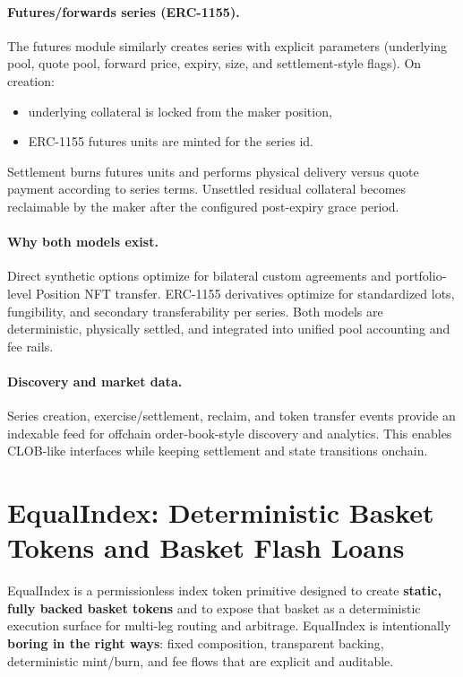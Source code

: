 \documentclass[version=preprint]{iacrcc}
\begin{document}
\paragraph{Futures/forwards series (ERC-1155).}
The futures module similarly creates series with explicit parameters (underlying pool, quote pool, forward price, expiry, size, and settlement-style flags). On creation:
\begin{itemize}
  \item underlying collateral is locked from the maker position,
  \item ERC-1155 futures units are minted for the series id.
\end{itemize}
Settlement burns futures units and performs physical delivery versus quote payment according to series terms. Unsettled residual collateral becomes reclaimable by the maker after the configured post-expiry grace period.

\paragraph{Why both models exist.}
Direct synthetic options optimize for bilateral custom agreements and portfolio-level Position NFT transfer. ERC-1155 derivatives optimize for standardized lots, fungibility, and secondary transferability per series. Both models are deterministic, physically settled, and integrated into unified pool accounting and fee rails.

\paragraph{Discovery and market data.}
Series creation, exercise/settlement, reclaim, and token transfer events provide an indexable feed for offchain order-book-style discovery and analytics. This enables CLOB-like interfaces while keeping settlement and state transitions onchain.

\section{EqualIndex: Deterministic Basket Tokens and Basket Flash Loans}

EqualIndex is a permissionless index token primitive designed to create \textbf{static, fully backed basket tokens} and to expose that basket as a deterministic execution surface for multi-leg routing and arbitrage. EqualIndex is intentionally \textbf{boring in the right ways}: fixed composition, transparent backing, deterministic mint/burn, and fee flows that are explicit and auditable.
\end{document}
